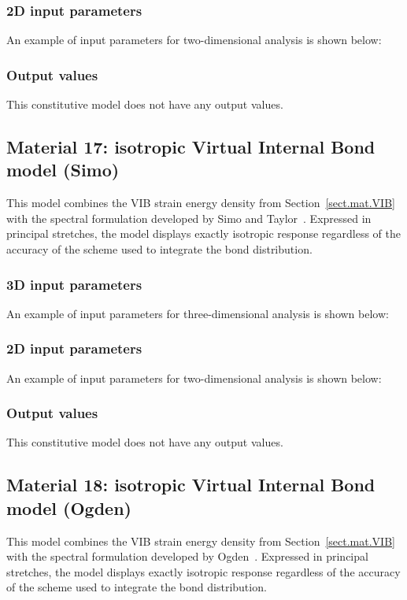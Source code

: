 \subsubsection{2D input parameters}
An example of input parameters for two-dimensional analysis is shown 
below:

\subsubsection{Output values}
This constitutive model does not have any output values.

\subsection{Material 17: isotropic Virtual Internal Bond model (Simo)}
\label{sect.mat.VIB.Simo}
This model combines the VIB strain energy density from
Section~\ref{sect.mat.VIB} with the
spectral formulation developed by Simo and Taylor~\cite{Simo1991}.
Expressed in principal stretches, the model displays
exactly isotropic response regardless of the accuracy of the
scheme used to integrate the bond distribution.

\subsubsection{3D input parameters}
An example of input parameters for three-dimensional analysis is shown 
below:

\subsubsection{2D input parameters}
An example of input parameters for two-dimensional analysis is shown 
below:

\subsubsection{Output values}
This constitutive model does not have any output values.

\subsection{Material 18: isotropic Virtual Internal Bond model (Ogden)}
\label{sect.mat.VIB.Ogden}
This model combines the VIB strain energy density from
Section~\ref{sect.mat.VIB} with the
spectral formulation developed by Ogden~\cite{Ogden1983}.
Expressed in principal stretches, the model displays
exactly isotropic response regardless of the accuracy of the
scheme used to integrate the bond distribution.

